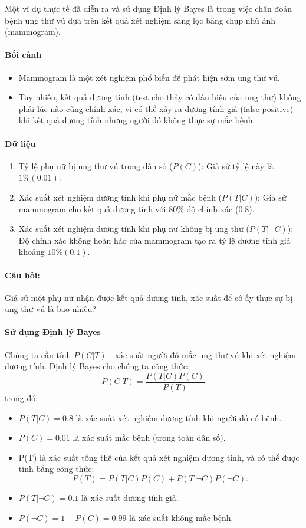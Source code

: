 \begin{vidu}
    Một ví dụ thực tế đã diễn ra và sử dụng Định lý Bayes là trong việc chẩn đoán bệnh ung thư vú dựa trên kết quả xét nghiệm sàng lọc bằng chụp nhũ ảnh (mammogram).
\paragraph{Bối cảnh}
\begin{itemize}
    \item Mammogram là một xét nghiệm phổ biến để phát hiện sớm ung thư vú.
    \item Tuy nhiên, kết quả dương tính (test cho thấy có dấu hiệu của ung thư) không phải lúc nào cũng chính xác, vì có thể xảy ra dương tính giả (false positive) - khi kết quả dương tính nhưng người đó không thực sự mắc bệnh.
\end{itemize}
\paragraph{Dữ liệu}
\begin{enumerate}
    \item Tỷ lệ phụ nữ bị ung thư vú trong dân số ($P(C)$): Giả sử tỷ lệ này là $1\%(0.01)$.
    \item Xác suất xét nghiệm dương tính khi phụ nữ mắc bệnh ($P(T\vert C)$): Giả sử mammogram cho kết quả dương tính với $80\%$ độ chính xác ($0.8$).
    \item Xác suất xét nghiệm dương tính khi phụ nữ không bị ung thư ($P(T\vert \lnot C)$): Độ chính xác không hoàn hảo của mammogram tạo ra tỷ lệ dương tính giả khoảng $10\% (0.1)$.
\end{enumerate}
\paragraph{Câu hỏi:} Giả sử một phụ nữ nhận được kết quả dương tính, xác suất để cô ấy thực sự bị ung thư vú là bao nhiêu?
\paragraph{Sử dụng Định lý Bayes}
Chúng ta cần tính $P(C\vert T)$ - xác suất người đó mắc ung thư vú khi xét nghiệm dương tính. Định lý Bayes cho chúng ta công thức:
\begin{equation*}
    P(C\vert T)=\frac{P(T\vert C)P(C)}{P(T)}
\end{equation*}
trong đó:
\begin{itemize}
    \item $P(T\vert C)=0.8$ là xác suất xét nghiệm dương tính khi người đó có bệnh.
    \item $P(C)=0.01$ là xác suất mắc bệnh (trong toàn dân số).
    \item P(T) là xác suất tổng thể của kết quả xét nghiệm dương tính, và có thể được tính bằng công thức:
    \begin{equation*}
        P(T)=P(T\vert C)P(C)+P(T\vert \lnot C)P(\lnot C).
    \end{equation*}
    \item $P(T\vert \lnot C)=0.1$ là xác suất dương tính giả.
    \item $P(\lnot C)=1-P(C)=0.99$ là xác suất không mắc bệnh.
\end{itemize}

\end{vidu}
